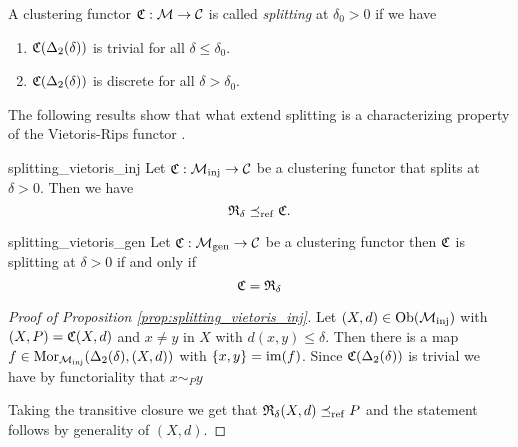 \begin{definition}{}{}
    A clustering functor $\mathfrak{C}: \mathcal{M} \to \mathcal{C}$ is called \emph{splitting} at $\delta_0 > 0$ if we have
    \begin{enumerate}
        \item $\mathfrak{C}(\Delta_2(\delta))$ is trivial for all $\delta \leq \delta_0$.
        \item $\mathfrak{C}(\Delta_2(\delta))$ is discrete for all $\delta > \delta_0$.
    \end{enumerate}
\end{definition}



The following results show that what extend splitting is a characterizing property of the Vietoris-Rips functor \cite[Theorem~6.4]{Carlsson2010}.

\begin{proposition}{}{splitting_vietoris_inj}
    Let $\mathfrak{C}: {\mathcal{M}_\mathrm{inj}} \to \mathcal{C}$ be a clustering functor that splits at $\delta > 0$. Then we have 
    $$
    \mathfrak{R}_\delta \preceq_\mathrm{ref} \mathfrak{C}.
    $$
\end{proposition}


\begin{proposition}{\source}{splitting_vietoris_gen}
    Let $\mathfrak{C}: {\mathcal{M}_\mathrm{gen}} \to \mathcal{C}$ be a clustering functor then $\mathfrak{C}$ is splitting at $\delta > 0$ if and only if 
    $$
    \mathfrak{C} = \mathfrak{R}_\delta
    $$
\end{proposition}

\begin{proof}[Proof of Proposition \ref{prop:splitting_vietoris_inj}]
    Let $(X,d) \in \mathrm {Ob}({\mathcal{M}_\mathrm{inj}})$ with $(X,P) = \mathfrak{C}(X,d)$ and $x \neq y$ in $X$ with $d(x,y) \leq \delta$.
    Then there is a map $f \in \mathrm {Mor}_{\mathcal{M}_\mathrm{inj}}(\Delta_2(\delta), (X,d))$ with $\{x,y\} = \operatorname*{im}(f)$.
    Since $\mathfrak{C}(\Delta_2(\delta))$ is trivial we have by functoriality that $x \sim_P y$

    Taking the transitive closure we get that $\mathfrak{R}_\delta(X,d) \preceq_\mathrm{ref} P$ and the statement follows by generality of $(X,d)$.
\end{proof}


